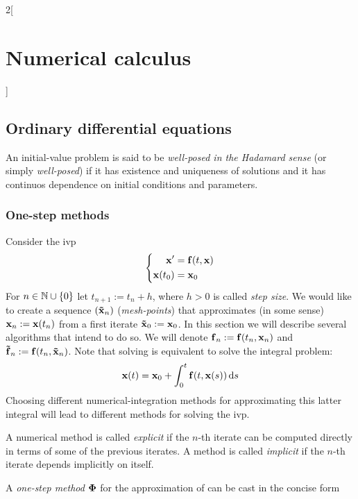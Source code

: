 \documentclass[../../../main_math.tex]{subfiles}
\begin{document}
\begin{multicols}{2}[\section{Numerical calculus}]
  \subsection{Ordinary differential equations}
  \begin{definition}
    An initial-value problem is said to be \emph{well-posed in the Hadamard sense} (or simply \emph{well-posed}) if it has existence and uniqueness of solutions and it has continuos dependence on initial conditions and parameters.
  \end{definition}
  \subsubsection{One-step methods}
  Consider the ivp
  \begin{equation}\label{NC:ivp}
    \left\{
    \begin{aligned}
      \boldsymbol{\mathrm{x}}'     & = \boldsymbol{\mathrm{f}}(t,\boldsymbol{\mathrm{x}}) \\
      \boldsymbol{\mathrm{x}}(t_0) & = \boldsymbol{\mathrm{x}}_0
    \end{aligned}
    \right.
  \end{equation}
  For $n\in\mathbb{N}\cup\{0\}$ let $t_{n+1}:=t_{n}+h$, where $h>0$ is called \emph{step size}. We would like to create a sequence $(\boldsymbol{\mathrm{\tilde{x}}}_n)$ (\emph{mesh-points}) that approximates (in some sense) $\boldsymbol{\mathrm{{x}}}_n:=\boldsymbol{\mathrm{{x}}}(t_n)$ from a first iterate $\boldsymbol{\mathrm{\tilde{x}}}_0:=\boldsymbol{\mathrm{x}}_0$. In this section we will describe several algorithms that intend to do so. We will denote $\boldsymbol{\mathrm{f}}_n:=\boldsymbol{\mathrm{f}}(t_n,\boldsymbol{\mathrm{x}}_{n})$ and $\boldsymbol{\mathrm{\tilde{f}}}_n:=\boldsymbol{\mathrm{f}}(t_n,\boldsymbol{\mathrm{\tilde{x}}}_{n})$. Note that solving  is equivalent to solve the integral problem:
  $$\boldsymbol{\mathrm{x}}(t)=\boldsymbol{\mathrm{x}}_0+\int_0^t\boldsymbol{\mathrm{f}}(t,\boldsymbol{\mathrm{x}}(s))\dd{s}$$
  Choosing different numerical-integration methods for approximating this latter integral will lead to different methods for solving the ivp.
  \begin{definition}
    A numerical method is called \emph{explicit} if the $n$-th iterate can be computed directly in terms of some of the previous iterates. A method is called \emph{implicit} if the $n$-th iterate depends implicitly on itself.
  \end{definition}
  \begin{definition}
    A \emph{one-step method} $\boldsymbol{\mathrm{\Phi}}$ for the approximation of  can be cast in the concise form

\end{definition}
\end{multicols}
\end{document}
